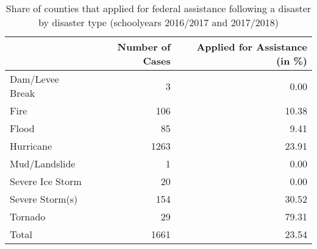 \begin{table}

\caption{\label{tab:AppsByType}Share of counties that applied for federal assistance following a disaster by disaster type (schoolyears 2016/2017 and 2017/2018)}
\centering
\begin{tabular}[t]{lrr}
\toprule
  & Number of Cases & Applied for Assistance (in \%)\\
\midrule
Dam/Levee Break & 3 & 0.00\\
Fire & 106 & 10.38\\
Flood & 85 & 9.41\\
Hurricane & 1263 & 23.91\\
Mud/Landslide & 1 & 0.00\\
\addlinespace
Severe Ice Storm & 20 & 0.00\\
Severe Storm(s) & 154 & 30.52\\
Tornado & 29 & 79.31\\
Total & 1661 & 23.54\\
\bottomrule
\end{tabular}
\end{table}
